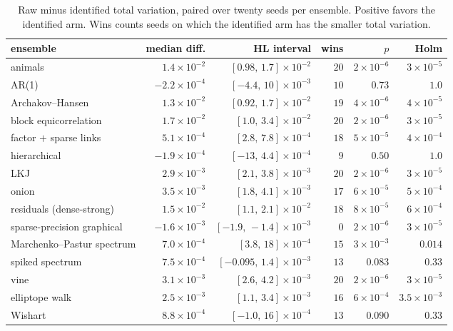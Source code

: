 \documentclass[11pt]{article}
\begin{document}
\begin{table}[h]\centering\footnotesize
\setlength{\tabcolsep}{4pt}
\begin{tabular}{lrrrrr}
\toprule
ensemble & median diff. & HL interval & wins & $p$ & Holm \\
\midrule
animals & $1.4\times10^{-2}$ & $[0.98,\,1.7]\times10^{-2}$ & $20$ & $2\times10^{-6}$ & $3\times10^{-5}$\\
AR(1) & $-2.2\times10^{-4}$ & $[-4.4,\,10]\times10^{-3}$ & $10$ & $0.73$ & $1.0$\\
Archakov--Hansen & $1.3\times10^{-2}$ & $[0.92,\,1.7]\times10^{-2}$ & $19$ & $4\times10^{-6}$ & $4\times10^{-5}$\\
block equicorrelation & $1.7\times10^{-2}$ & $[1.0,\,3.4]\times10^{-2}$ & $20$ & $2\times10^{-6}$ & $3\times10^{-5}$\\
factor $+$ sparse links & $5.1\times10^{-4}$ & $[2.8,\,7.8]\times10^{-4}$ & $18$ & $5\times10^{-5}$ & $4\times10^{-4}$\\
hierarchical & $-1.9\times10^{-4}$ & $[-13,\,4.4]\times10^{-4}$ & $9$ & $0.50$ & $1.0$\\
LKJ & $2.9\times10^{-3}$ & $[2.1,\,3.8]\times10^{-3}$ & $20$ & $2\times10^{-6}$ & $3\times10^{-5}$\\
onion & $3.5\times10^{-3}$ & $[1.8,\,4.1]\times10^{-3}$ & $17$ & $6\times10^{-5}$ & $5\times10^{-4}$\\
residuals (dense-strong) & $1.5\times10^{-2}$ & $[1.1,\,2.1]\times10^{-2}$ & $18$ & $8\times10^{-5}$ & $6\times10^{-4}$\\
sparse-precision graphical & $-1.6\times10^{-3}$ & $[-1.9,\,-1.4]\times10^{-3}$ & $0$ & $2\times10^{-6}$ & $3\times10^{-5}$\\
Marchenko--Pastur spectrum & $7.0\times10^{-4}$ & $[3.8,\,18]\times10^{-4}$ & $15$ & $3\times10^{-3}$ & $0.014$\\
spiked spectrum & $7.5\times10^{-4}$ & $[-0.095,\,1.4]\times10^{-3}$ & $13$ & $0.083$ & $0.33$\\
vine & $3.1\times10^{-3}$ & $[2.6,\,4.2]\times10^{-3}$ & $20$ & $2\times10^{-6}$ & $3\times10^{-5}$\\
elliptope walk & $2.5\times10^{-3}$ & $[1.1,\,3.4]\times10^{-3}$ & $16$ & $6\times10^{-4}$ & $3.5\times10^{-3}$\\
Wishart & $8.8\times10^{-4}$ & $[-1.0,\,16]\times10^{-4}$ & $13$ & $0.090$ & $0.33$\\
\bottomrule
\end{tabular}
\caption{Raw minus identified total variation, paired over twenty seeds
per ensemble. Positive favors the identified arm. Wins counts seeds on
which the identified arm has the smaller total variation.}\label{tab:paired}
\end{table}
\end{document}
